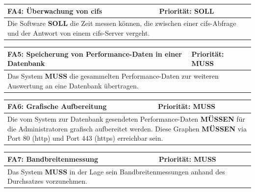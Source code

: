 \documentclass[titlepage]{report}
\begin{document}
\begin{center}
\begin{tabular}{p{}>{\raggedleft\arraybackslash}p{}}\toprule
    \textbf{FA4: Überwachung von \gls{cifs} } & \textbf{Priorität: SOLL} \\\midrule
	\multicolumn{2}{p{\textwidth-\tabcolsep}}{%
    Die Software \textbf{SOLL} die Zeit messen können, die
    zwischen einer \gls{cifs}-Abfrage und der Antwort von einem
    \gls{cifs}-Server vergeht.}\\\bottomrule
\end{tabular}
    \label{table:FA4}
\end{center}
\begin{center}
\begin{tabular}{p{}>{\raggedleft\arraybackslash}p{}}\toprule
    \textbf{FA5: Speicherung von Performance-Daten in einer Datenbank } & \textbf{Priorität: MUSS} \\\midrule
	\multicolumn{2}{p{\textwidth-\tabcolsep}}{%
        Das System \textbf{MUSS} die gesammelten Performance-Daten
        zur weiteren Auswertung an eine Datenbank übertragen.}\\\bottomrule
\end{tabular}
    \label{table:FA5}
\end{center}
\begin{center}
\begin{tabular}{p{}>{\raggedleft\arraybackslash}p{}}\toprule
    \textbf{FA6: Grafische Aufbereitung } & \textbf{Priorität: MUSS} \\\midrule
	\multicolumn{2}{p{\textwidth-\tabcolsep}}{%
        Die vom System zur Datenbank gesendeten Performance-Daten
        \textbf{MÜSSEN} für die Administratoren grafisch
        aufbereitet werden.
        Diese Graphen \textbf{MÜSSEN} via Port 80 (\gls{http})
        und Port 443 (\gls{https}) erreichbar sein.
        }\\\bottomrule
\end{tabular}
    \label{table:FA6}
\end{center}
\begin{center}
\begin{tabular}{p{}>{\raggedleft\arraybackslash}p{}}\toprule
    \textbf{FA7: Bandbreitenmessung } & \textbf{Priorität: MUSS} \\\midrule
	\multicolumn{2}{p{\textwidth-\tabcolsep}}{%
        Das System \textbf{MUSS} in der Lage sein Bandbreitenmessungen anhand des
        Durchsatzes vorzunehmen.
                }\\\bottomrule
\end{tabular}
    \label{table:FA7}
\end{center}
\end{document}
